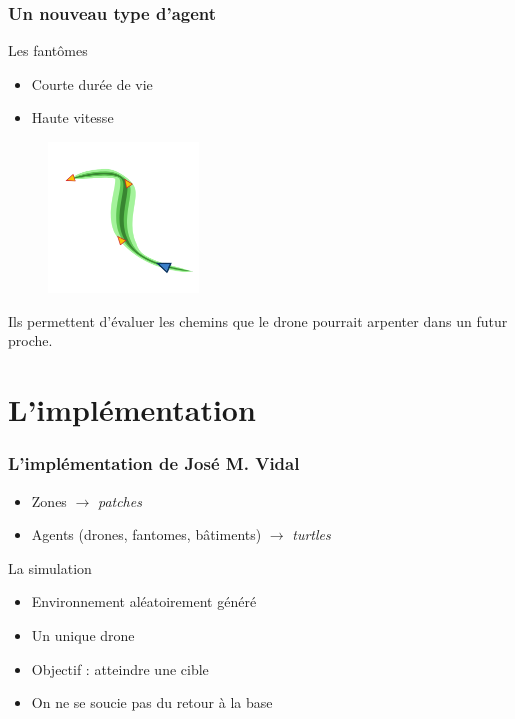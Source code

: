 \documentclass{beamer}
\begin{document}
\begin{frame}

  \frametitle{Un nouveau type d'agent}

  \begin{block}{Les fantômes}
    \begin{itemize}
    \item{Courte durée de vie}
    \item{Haute vitesse}
    \end{itemize}
  \end{block}

  \vfill

  \begin{figure}
    \centering
    \includegraphics[width=4cm]{ghosts.png}
  \end{figure}

  \vfill

  Ils permettent d'évaluer les chemins que le drone pourrait arpenter
  dans un futur proche.

\end{frame}

\section{L'implémentation}

\begin{frame}

  \frametitle{L'implémentation de José M. Vidal}

  \begin{block}{}
    \begin{itemize}
    \item{Zones $\rightarrow$ \textit{patches}}
    \item{Agents (drones, fantomes, bâtiments) $\rightarrow$ \textit{turtles}}
    \end{itemize}
  \end{block}

  \vfill

  \begin{block}{La simulation}
    \begin{itemize}
    \item{Environnement aléatoirement généré}
    \item{Un unique drone}
    \item{Objectif : atteindre une cible}
    \item{On ne se soucie pas du retour à la base}
    \end{itemize}
  \end{block}

\end{frame}
\end{document}
